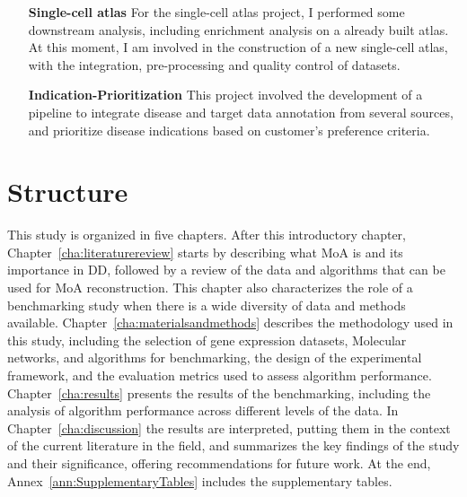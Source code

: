 \begin{enumerate}
\item[\textbf{Single-cell atlas}] For the single-cell atlas project, I performed some downstream analysis, including enrichment analysis on a already built atlas. At this moment, I am involved in the construction of a new single-cell atlas, with the integration, pre-processing and quality control of datasets.
\item[\textbf{Indication-Prioritization}] This project involved the development of a pipeline to integrate disease and target data annotation from several sources, and prioritize disease indications based on customer's preference criteria.
\end{enumerate}

\section{Structure} %
\label{sec:structure}

This study is organized in five chapters.
After this introductory chapter, Chapter~\ref{cha:literaturereview} starts by describing what \gls{MoA} is and its importance in \gls{DD}, followed by a review of the data and algorithms that can be used for \gls{MoA} reconstruction. This chapter also characterizes the role of a benchmarking study when there is a wide diversity of data and methods available.
Chapter~\ref{cha:materialsandmethods} describes the methodology used in this study, including the selection of gene expression datasets, \gls{Molecular network}s, and algorithms for benchmarking, the design of the experimental framework, and the evaluation metrics used to assess algorithm performance.
Chapter~\ref{cha:results} presents the results of the benchmarking, including the analysis of algorithm performance across different levels of the data.
In Chapter~\ref{cha:discussion} the results are interpreted, putting them in the context of the current literature in the field, and summarizes the key findings of the study and their significance, offering recommendations for future work.
At the end, Annex~\ref{ann:SupplementaryTables} includes the supplementary tables.